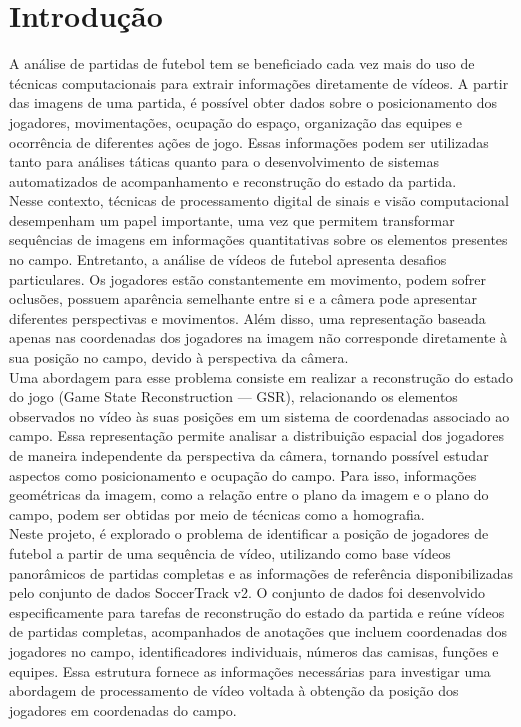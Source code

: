 \section{Introdução}
A análise de partidas de futebol tem se beneficiado cada vez mais do uso de técnicas computacionais para extrair informações diretamente de vídeos. A partir das imagens de uma partida, é possível obter dados sobre o posicionamento dos jogadores, movimentações, ocupação do espaço, organização das equipes e ocorrência de diferentes ações de jogo. Essas informações podem ser utilizadas tanto para análises táticas quanto para o desenvolvimento de sistemas automatizados de acompanhamento e reconstrução do estado da partida.\\

Nesse contexto, técnicas de processamento digital de sinais e visão computacional desempenham um papel importante, uma vez que permitem transformar sequências de imagens em informações quantitativas sobre os elementos presentes no campo. Entretanto, a análise de vídeos de futebol apresenta desafios particulares. Os jogadores estão constantemente em movimento, podem sofrer oclusões, possuem aparência semelhante entre si e a câmera pode apresentar diferentes perspectivas e movimentos. Além disso, uma representação baseada apenas nas coordenadas dos jogadores na imagem não corresponde diretamente à sua posição no campo, devido à perspectiva da câmera.\\

Uma abordagem para esse problema consiste em realizar a reconstrução do estado do jogo (Game State Reconstruction — GSR), relacionando os elementos observados no vídeo às suas posições em um sistema de coordenadas associado ao campo. Essa representação permite analisar a distribuição espacial dos jogadores de maneira independente da perspectiva da câmera, tornando possível estudar aspectos como posicionamento e ocupação do campo. Para isso, informações geométricas da imagem, como a relação entre o plano da imagem e o plano do campo, podem ser obtidas por meio de técnicas como a homografia.\\

Neste projeto, é explorado o problema de identificar a posição de jogadores de futebol a partir de uma sequência de vídeo, utilizando como base vídeos panorâmicos de partidas completas e as informações de referência disponibilizadas pelo conjunto de dados SoccerTrack v2. O conjunto de dados foi desenvolvido especificamente para tarefas de reconstrução do estado da partida e reúne vídeos de partidas completas, acompanhados de anotações que incluem coordenadas dos jogadores no campo, identificadores individuais, números das camisas, funções e equipes. Essa estrutura fornece as informações necessárias para investigar uma abordagem de processamento de vídeo voltada à obtenção da posição dos jogadores em coordenadas do campo.\\

